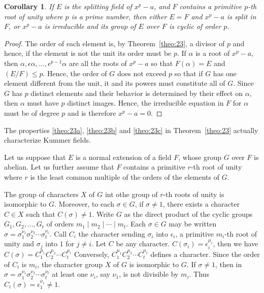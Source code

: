 \documentclass[10pt,leqno]{article}
\newtheorem*{coro*}{Corollary}
\theoremstyle{definition}
\begin{document}
\begin{coro*}
If $E$ is the splitting field of $x^p - a$, and $F$ contains a primitive $p$-th root of unity where $p$ is a prime number, then either $E = F$ and $x^p - a$ is split in $F$, or $x^p - a$ is irreducible and its group of $E$ over $F$ is cyclic of order $p$.
\end{coro*}


\begin{proof}
The order of each element is, by Theorem~\ref{theo:23}, a divisor of $p$ and hence, if the element is not the unit its order must be $p$.
If $\alpha$ is a root of $x^p - a$, then $\alpha, \epsilon\alpha, \ldots, \epsilon^{p-1} \alpha$ are all the roots of $x^p - a$ so that $F(\alpha) = E$ and $(E/F) \leq p$.
Hence, the order of $G$ does not exceed $p$ so that if $G$ has one element different from the unit, it and its powers must constitute all of $G$.
Since $G$ has $p$ distinct elements and their behavior is determined by their effect on $\alpha$, then $\alpha$ must have $p$ distinct images.
Hence, the irreducible equation in $F$ for $\alpha$ must be of degree $p$ and is therefore $x^p - a = 0$.
\end{proof}


The properties \eqref{theo:23a}, \eqref{theo:23b} and \eqref{theo:23c} in Theorem~\ref{theo:23} actually characterize Kummer fields.


Let us suppose that $E$ is a normal extension of a field $F$, whose group $G$ over $F$ is abelian.
Let us further assume that $F$ contains a primitive $r$-th root of unity where $r$ is the least common multiple of the orders of the elements of $G$.

The group of characters $X$ of $G$ int othe group of $r$-th roots of unity is isomorphic to $G$.
Moreover, to each $\sigma \in G$, if $\sigma \not= 1$, there exists a character $C \in X$ such that $C(\sigma) \not= 1$.
Write $G$ as the direct product of the cyclic groups $G_1, G_2, \ldots, G_t$ of orders $m_1 \mid m_2 \mid \cdots \mid m_t$.
Each $\sigma \in G$ may be written $\sigma = \sigma_1^{\nu_1} \sigma_2^{\nu_2} \cdots \sigma_t^{\nu_t}$.
Call $C_i$ the character sending $\sigma_i$ into $\epsilon_i$, a primitive $m_i$-th root of unity and $\sigma_j$ into $1$ for $j\not= i$.
Let $C$ be any character.
$C(\sigma_i) = \epsilon_i^{\mu_i}$, then we have $C(\sigma) = C_1^{\mu_1} C_2^{\mu_2} \cdots C_t^{\mu_t}$
Conversely, $C_1^{\mu_1} C_2^{\mu_2} \cdots C_t^{\mu_t}$ defines a character.
Since the order of $C_i$ is $m_i$, the character group $X$ of $G$ is isomorphic to $G$.
If $\sigma \not= 1$, then in $\sigma = \sigma_1^{\nu_1} \sigma_2^{\nu_2} \cdots \sigma_t^{\nu_t}$ at least one $\nu_i$, say $\nu_1$, is not divisible by $m_i$.
Thus $C_i(\sigma) = \epsilon_1^{\nu_1} \not= 1$.
\end{document}
